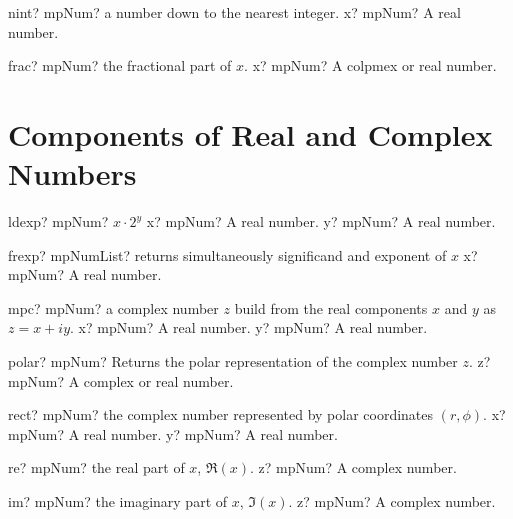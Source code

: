 \documentclass[12pt,a4paper,openany]{book}
\begin{document}
\begin{mpFunctionsExtract}
\mpFunctionOne
{nint? mpNum?  a number down to the nearest integer.}
{x? mpNum? A real number.}
\end{mpFunctionsExtract}

\begin{mpFunctionsExtract}
\mpFunctionOne
{frac? mpNum? the fractional part of $x$.}
{x? mpNum? A colpmex or real number.}
\end{mpFunctionsExtract}

\section{Components of Real and Complex Numbers}

\begin{mpFunctionsExtract}
\mpFunctionTwo
{ldexp? mpNum? $x \cdot 2^{y}$}
{x? mpNum? A real number.}
{y? mpNum? A real number.}
\end{mpFunctionsExtract}

\begin{mpFunctionsExtract}
\mpFunctionOne
{frexp? mpNumList? returns simultaneously significand and exponent of $x$}
{x? mpNum? A real number.}
\end{mpFunctionsExtract}

\begin{mpFunctionsExtract}
\mpFunctionTwo
{mpc? mpNum? a complex number $z$ build from the real components $x$ and $y$ as $z=x+iy$.}
{x? mpNum? A real number.}
{y? mpNum? A real number.}
\end{mpFunctionsExtract}

\begin{mpFunctionsExtract}
\mpFunctionOne
{polar? mpNum? Returns the polar representation of the complex number $z$.}
{z? mpNum? A complex or real number.}
\end{mpFunctionsExtract}

\begin{mpFunctionsExtract}
\mpFunctionTwo
{rect? mpNum? the complex number represented by polar coordinates $(r,\phi)$.}
{x? mpNum? A real number.}
{y? mpNum? A real number.}
\end{mpFunctionsExtract}

\begin{mpFunctionsExtract}
\mpFunctionOne
{re? mpNum? the real part of $x$, $\Re(x)$.}
{z? mpNum? A complex number.}
\end{mpFunctionsExtract}

\begin{mpFunctionsExtract}
\mpFunctionOne
{im? mpNum? the imaginary part of $x$, $\Im(x)$.}
{z? mpNum? A complex number.}
\end{mpFunctionsExtract}
\end{document}
